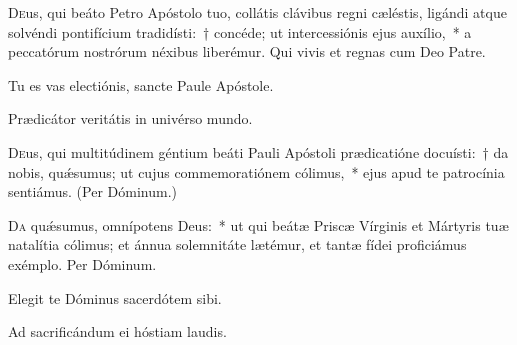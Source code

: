 \documentclass[vesperale_romanum.tex]{subfiles}
\begin{document}

\oratio
\label{oratio_festo_cathedrae_s_petri}
\lettrine{D}{e}us, qui beáto Petro Apóstolo tuo, collátis clávibus regni cæléstis, ligándi atque solvéndi pontifícium tradidísti:~† concéde; ut intercessiónis ejus auxílio,~* a peccatórum nostrórum néxibus liberémur. Qui vivis et regnas cum Deo Patre.


\vv Tu es vas electiónis, sancte Paule Apóstole.

\rr Prædicátor veritátis in univérso mundo.
\label{oratio_s_pauli}
\oratio

\lettrine{D}{e}us, qui multitúdinem géntium beáti Pauli Apóstoli prædicatióne docuísti:~† da nobis, quǽsumus; ut cujus commemoratiónem cólimus,~* ejus apud te patrocínia sentiámus. (Per Dóminum.)



\oratio

\lettrine{D}{a} quǽsumus, omnípotens Deus:~* ut qui beátæ Priscæ Vírginis et Mártyris tuæ natalítia cólimus; et ánnua sole\-mnitáte lætémur, et tantæ fídei proficiámus exémplo.
Per Dóminum.


 

\vv Elegit te Dóminus sacerdótem sibi.

\rr Ad sacrificándum ei hóstiam laudis.


\end{document}
